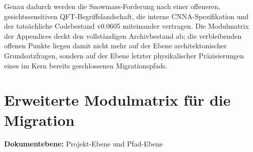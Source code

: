 \documentclass[11pt,a4paper]{article}
\newcommand{\doclevel}[1]{\par\small\noindent\textbf{Dokumentebene:} #1\par\normalsize\medskip}
\begin{document}
Genau dadurch werden die Snowmass-Forderung nach einer offeneren, gesichtssensitiven QFT-Begriffslandschaft,
die interne CNNA-Spezifikation und der tatsächliche Codebestand v0.0605 miteinander vertragen.\cite{Dedushenko2023}\cite{CNNASpec}\cite{RulebookV18}
Die Modulmatrix der Appendices deckt den vollständigen Archivbestand ab; die verbleibenden
offenen Punkte liegen damit nicht mehr auf der Ebene architektonischer Grundsatzfragen, sondern auf
der Ebene letzter physikalischer Präzisierungen eines im Kern bereits geschlossenen
Migrationspfads.
\newpage
\appendix

\section{Erweiterte Modulmatrix für die Migration}
\doclevel{Projekt-Ebene und Pfad-Ebene}
\end{document}
